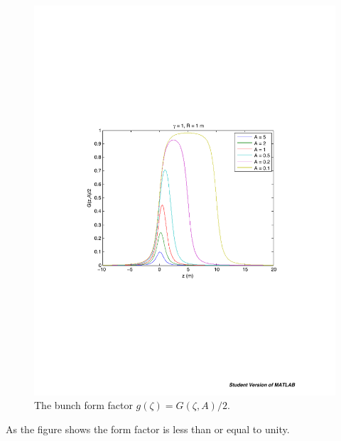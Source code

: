 \begin{figure}[h]
  \begin{center}
        \includegraphics[width=120mm]{figures/Gfact}
        \caption{The bunch form factor $g(\zeta) = G(\zeta,A)/2$.}
    \label{fig:gmoney}
  \end{center}
\end{figure}
%
As the figure shows the form factor is less than or equal to unity.

